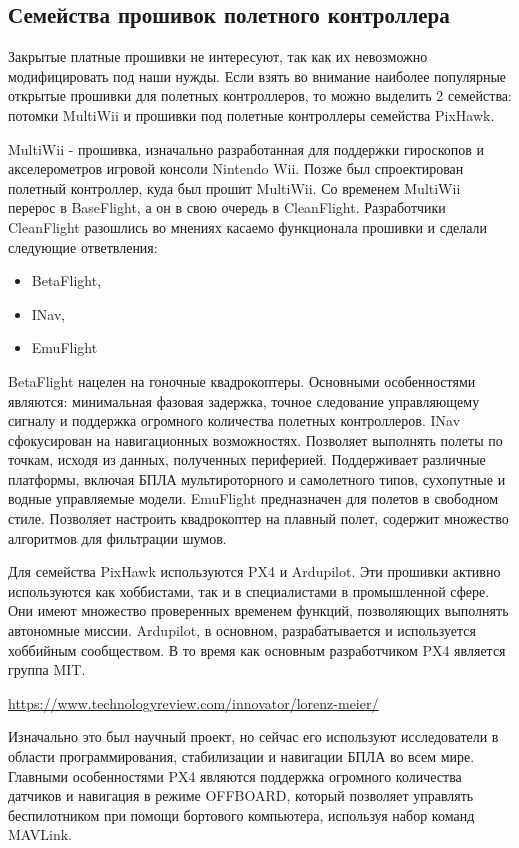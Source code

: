\subsection{Семейства прошивок полетного контроллера}
Закрытые платные прошивки не интересуют, так как их невозможно модифицировать под наши нужды. Если взять во внимание наиболее популярные открытые прошивки для полетных контроллеров, то можно выделить 2 семейства: потомки MultiWii и прошивки под полетные контроллеры семейства PixHawk.

MultiWii - прошивка, изначально разработанная для поддержки гироскопов и акселерометров игровой консоли Nintendo Wii. Позже был спроектирован полетный контроллер, куда был прошит MultiWii. Со временем MultiWii перерос в BaseFlight, а он в свою очередь в CleanFlight. Разработчики CleanFlight разошлись во мнениях касаемо функционала прошивки и сделали следующие ответвления:
\begin{itemize}
	\begin{itemize}
		\item BetaFlight,
		\item INav,
		\item EmuFlight
		\end{itemize}
\end{itemize}

BetaFlight нацелен на гоночные квадрокоптеры. Основными особенностями являются: минимальная фазовая задержка, точное следование управляющему сигналу и поддержка огромного количества полетных контроллеров.
INav сфокусирован на навигационных возможностях. Позволяет выполнять полеты по точкам, исходя из данных, полученных периферией. Поддерживает различные платформы, включая БПЛА мультироторного и самолетного типов, сухопутные и водные управляемые модели.
EmuFlight предназначен для полетов в свободном стиле. Позволяет настроить квадрокоптер на плавный полет, содержит множество алгоритмов для фильтрации шумов.

Для семейства PixHawk используются PX4 и Ardupilot. Эти прошивки активно используются как хоббистами, так и в специалистами в промышленной сфере. Они имеют множество проверенных временем функций, позволяющих выполнять автономные миссии. Ardupilot, в основном, разрабатывается и используется хоббийным сообществом. В то время как основным разработчиком PX4 является группа MIT.

\url{https://www.technologyreview.com/innovator/lorenz-meier/}

Изначально это был научный проект, но сейчас его используют исследователи в области программирования, стабилизации и навигации БПЛА во всем мире.
Главными особенностями PX4 являются поддержка огромного количества датчиков и навигация в режиме OFFBOARD, который позволяет управлять беспилотником при помощи бортового компьютера, используя набор команд MAVLink.


